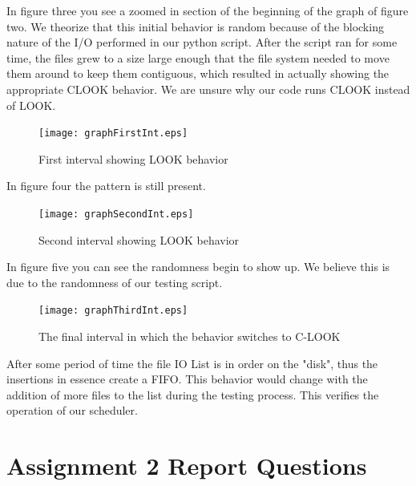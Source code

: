 \documentclass[letterpaper,10pt,draftclsnofoot,onecolumn]{IEEEtran}
\begin{document}
In figure three you see a zoomed in section of the beginning of the graph of figure two. We theorize that this initial behavior is random because of the blocking nature of the I/O performed in our python script. After the script ran for some time, the files grew to a size large enough that the file system needed to move them around to keep them contiguous, which resulted in actually showing the appropriate CLOOK behavior. We are unsure why our code runs CLOOK instead of LOOK. 

\begin{figure}[!ht]
  \centering
  \texttt{[image: graphFirstInt.eps]}
  \centering
  \caption{First interval showing LOOK behavior}
\end{figure}

In figure four the pattern is still present.

\begin{figure}[!ht]
  \centering
  \texttt{[image: graphSecondInt.eps]}
  \centering
  \caption{Second interval showing LOOK behavior}
\end{figure}

In figure five you can see the randomness begin to show up. We believe this is due to the randomness of our testing script. 
\begin{figure}[ht!]
  \centering
  \texttt{[image: graphThirdInt.eps]}
  \centering
  \caption{The final interval in which the behavior switches to C-LOOK}
\end{figure}

After some period of time the file IO List is in order on the "disk", thus the insertions in essence create a FIFO. This behavior would change with the addition of more files to the list during the testing process. This verifies the operation of our scheduler.


\newpage

\section{Assignment 2 Report Questions}
\end{document}
